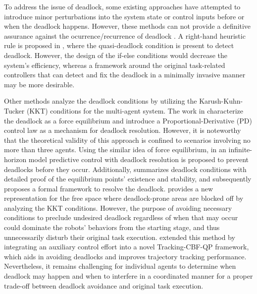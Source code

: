 \documentclass[letterpaper, 10 pt, conference]{ieeeconf}
\theoremstyle{plain}
\begin{document}
To address the issue of deadlock, some
existing approaches have attempted to introduce minor perturbations into the system state or control inputs \cite{zhu2023safety, liu2023realtime, renault2024multi, martinez2024avocado}
before or when
the deadlock happens. However, these methods can not provide a definitive assurance against the ocurrence/recurrence
of deadlock \cite{grover2023before}.
A right-hand heuristic rule is proposed in \cite{celi2019deconfliction}, where
the quasi-deadlock condition is present to detect deadlock. However, the design of the if-else conditions would decrease the system's efficiency, whereas a framework around the original task-related controllers that can detect and fix the deadlock in a minimally invasive manner may be more desirable. 

Other methods analyze the deadlock conditions by utilizing the Karush-Kuhn-Tucker (KKT) conditions for the multi-agent system. The work in
\cite{grover2023before, grover2021deadlock} characterize the deadlock as a force equilibrium and introduce a Proportional-Derivative (PD) control law as a mechanism for deadlock resolution. However, it is noteworthy that the theoretical validity of this approach is confined to scenarios involving no more than three agents. Using the similar idea of force equilibrium, in \cite{chen2022deadlock} an
infinite-horizon model predictive control with deadlock resolution is proposed to prevent deadlocks before they occur.
Additionally,
\cite{reis2020control} summarizes deadlock conditions with detailed proof of the equilibrium points' existence and stability, and subsequently proposes a formal framework to resolve the deadlock. 
\cite{cavorsi2023multi} provides a new representation for the free space where deadlock-prone areas are blocked off by analyzing the KKT conditions.
However, the purpose of avoiding necessary conditions to preclude undesired deadlock regardless of when that may occur could dominate the robots' behaviors from the starting stage, and thus unnecessarily disturb their original task execution.
\cite{desai2023auxiliary} extended this method by integrating an auxiliary control effort into a novel Tracking-CBF-QP framework, which aids in avoiding deadlocks and improves trajectory tracking performance. Nevertheless, it remains challenging 
for individual agents to determine when deadlock may happen and when to interfere in a coordinated manner for a proper trade-off between deadlock avoidance and original task execution. 
\end{document}
